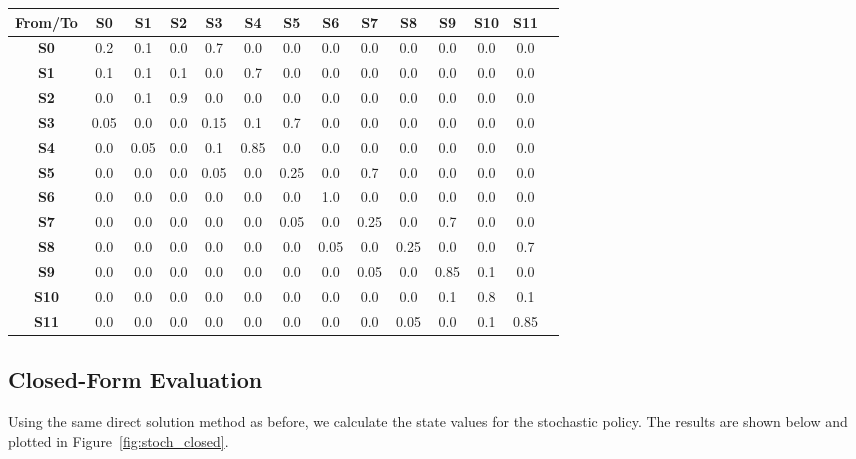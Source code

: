 \documentclass[12pt]{article}
\begin{document}
\begin{center}
\begin{tabular}{|c|c|c|c|c|c|c|c|c|c|c|c|c|c|}
\hline
\textbf{From/To} & \textbf{S0} & \textbf{S1} & \textbf{S2} & \textbf{S3} & \textbf{S4} & \textbf{S5} & \textbf{S6} & \textbf{S7} & \textbf{S8} & \textbf{S9} & \textbf{S10} & \textbf{S11} \\
\hline
\textbf{S0} & 0.2 & 0.1 & 0.0 & 0.7 & 0.0 & 0.0 & 0.0 & 0.0 & 0.0 & 0.0 & 0.0 & 0.0 \\
\hline
\textbf{S1} & 0.1 & 0.1 & 0.1 & 0.0 & 0.7 & 0.0 & 0.0 & 0.0 & 0.0 & 0.0 & 0.0 & 0.0 \\
\hline
\textbf{S2} & 0.0 & 0.1 & 0.9 & 0.0 & 0.0 & 0.0 & 0.0 & 0.0 & 0.0 & 0.0 & 0.0 & 0.0 \\
\hline
\textbf{S3} & 0.05 & 0.0 & 0.0 & 0.15 & 0.1 & 0.7 & 0.0 & 0.0 & 0.0 & 0.0 & 0.0 & 0.0 \\
\hline
\textbf{S4} & 0.0 & 0.05 & 0.0 & 0.1 & 0.85 & 0.0 & 0.0 & 0.0 & 0.0 & 0.0 & 0.0 & 0.0 \\
\hline
\textbf{S5} & 0.0 & 0.0 & 0.0 & 0.05 & 0.0 & 0.25 & 0.0 & 0.7 & 0.0 & 0.0 & 0.0 & 0.0 \\
\hline
\textbf{S6} & 0.0 & 0.0 & 0.0 & 0.0 & 0.0 & 0.0 & 1.0 & 0.0 & 0.0 & 0.0 & 0.0 & 0.0 \\
\hline
\textbf{S7} & 0.0 & 0.0 & 0.0 & 0.0 & 0.0 & 0.05 & 0.0 & 0.25 & 0.0 & 0.7 & 0.0 & 0.0 \\
\hline
\textbf{S8} & 0.0 & 0.0 & 0.0 & 0.0 & 0.0 & 0.0 & 0.05 & 0.0 & 0.25 & 0.0 & 0.0 & 0.7 \\
\hline
\textbf{S9} & 0.0 & 0.0 & 0.0 & 0.0 & 0.0 & 0.0 & 0.0 & 0.05 & 0.0 & 0.85 & 0.1 & 0.0 \\
\hline
\textbf{S10} & 0.0 & 0.0 & 0.0 & 0.0 & 0.0 & 0.0 & 0.0 & 0.0 & 0.0 & 0.1 & 0.8 & 0.1 \\
\hline
\textbf{S11} & 0.0 & 0.0 & 0.0 & 0.0 & 0.0 & 0.0 & 0.0 & 0.0 & 0.05 & 0.0 & 0.1 & 0.85 \\
\hline
\end{tabular}
\end{center}

\subsection{Closed-Form Evaluation}
Using the same direct solution method as before, we calculate the state values for the stochastic policy. The results are shown below and plotted in Figure~\ref{fig:stoch_closed}.
\end{document}
